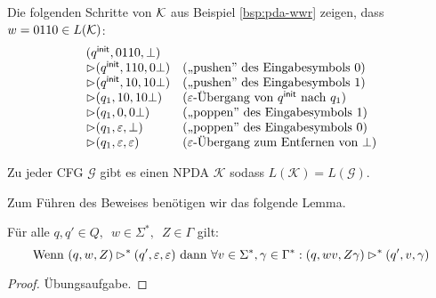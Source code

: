 \begin{Bsp*}
  Die folgenden Schritte von $\mathcal{K}$ aus Beispiel \ref{bsp:pda-wwr} zeigen, dass $w = 0110 \in L(\mathcal{K})$:
  \begin{displaymath}
  \begin{array}{ll}
    (q^\mathsf{init}, 0110, \bot) \\
    \rhd (q^\mathsf{init}, 110, 0\bot)  &\text{(,,pushen'' des Eingabesymbols $0$)}\\
    \rhd (q^\mathsf{init}, 10, 10\bot)  &\text{(,,pushen'' des Eingabesymbols $1$)}\\
    \rhd (q_1, 10, 10\bot)  &\text{($\varepsilon$-Übergang von $q^\mathsf{init}$ nach $q_1$)} \\
    \rhd (q_1, 0, 0\bot)  &\text{(,,poppen'' des Eingabesymbols $1$)}\\
    \rhd (q_1,\varepsilon, \bot) &\text{(,,poppen'' des Eingabesymbols $0$)}\\
    \rhd (q_1, \varepsilon, \varepsilon) &\text{($\varepsilon$-Übergang zum Entfernen von $\bot$)}
  \end{array}
\end{displaymath}
\end{Bsp*}

\begin{lemma}\label{lem:4.cfgToNpda}
 Zu jeder CFG $\mathcal{G}$ gibt es einen NPDA $\mathcal{K}$ sodass $L(\mathcal{K})=L(\mathcal{G})$.
\end{lemma}

  Zum Führen des Beweises benötigen wir das folgende Lemma.

\begin{lemma}\label{lem:4.mehrKeller}
Für alle $q,q' \in Q,\enspace w \in \Sigma^*,\enspace Z \in \Gamma$ gilt:
  \begin{displaymath}
    \text{Wenn } (q,w,Z) \rhd^* (q', \varepsilon, \varepsilon) \text{ dann } \forall v \in \Sigma^*, \gamma \in \Gamma^*: (q, wv, Z\gamma) \rhd^* (q', v, \gamma)
  \end{displaymath}
\end{lemma}
\begin{proof}
Übungsaufgabe.
\end{proof}


